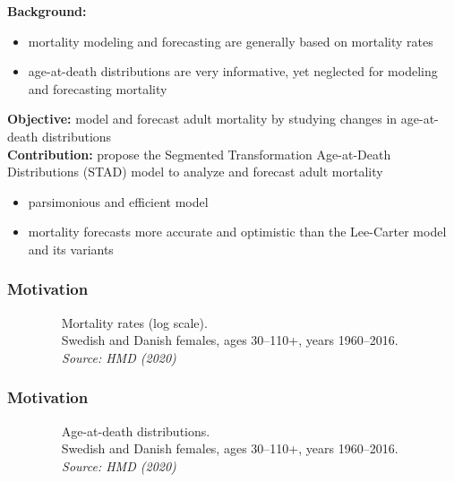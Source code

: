\documentclass[12pt, xcolor=table]{beamer}  %
\begin{document}
\begin{frame} %
	\textbf{Background:}
	\begin{itemize}
		\setlength\itemsep{0.5em}
		\item mortality modeling and forecasting are generally based on mortality rates 
		\item age-at-death distributions are very informative, yet neglected for modeling and forecasting mortality
	\end{itemize}
	\bigskip \pause
	\textbf{Objective:} model and forecast adult mortality by studying changes in age-at-death distributions 
	\\ \bigskip \pause
	\textbf{Contribution:} propose the Segmented Transformation Age-at-Death Distributions (STAD) model to analyze and forecast adult mortality
	\begin{itemize}
		\setlength\itemsep{0.5em}
		\item parsimonious and efficient model 
		\item mortality forecasts more accurate and optimistic than the Lee-Carter model and its variants
	\end{itemize}
	
\end{frame}

\begin{frame}\frametitle{Motivation}
\vspace{-0.2cm}
\begin{center}
\end{center}
\vspace{-0.3cm}
\tiny{$\quad\quad\quad\quad$ Mortality rates (log scale). \\ $\quad\quad\quad\quad$ Swedish and Danish females, ages 30--110+, years 1960--2016. \\ \emph{$\quad\quad\quad\quad$ Source: HMD (2020)}}
\end{frame}

\begin{frame}\frametitle{Motivation}
\vspace{-0.2cm}
\begin{center}
\end{center}
\vspace{-0.3cm}
\tiny{$\quad\quad\quad\quad$ Age-at-death distributions. \\ $\quad\quad\quad\quad$ Swedish and Danish females, ages 30--110+, years 1960--2016. \\ \emph{$\quad\quad\quad\quad$ Source: HMD (2020)}}
\end{frame}
\end{document}
